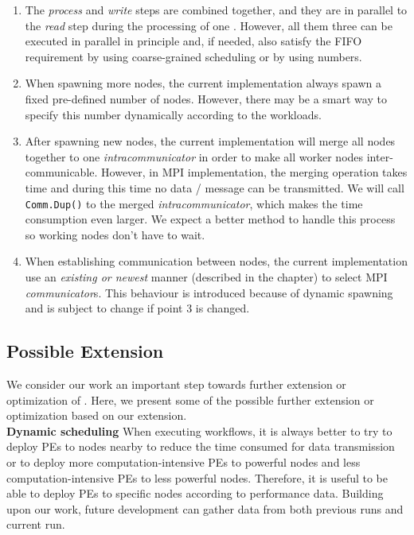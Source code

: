 \begin{enumerate}
	\item The \emph{process} and \emph{write} steps are combined together, and they are in parallel to the \emph{read} step during the processing of one \tPEInst. However, all them three can be executed in parallel in principle and, if needed, also satisfy the FIFO requirement by using coarse-grained scheduling or by using numbers.
	\item When spawning more nodes, the current implementation always spawn a fixed pre-defined number of nodes. However, there may be a smart way to specify this number dynamically according to the workloads.
	\item After spawning new nodes, the current implementation will merge all nodes together to one \emph{intracommunicator} in order to make all worker nodes inter-communicable. However, in MPI implementation, the merging operation takes time and during this time no data / message can be transmitted. We will call \lstinline|Comm.Dup()| to the merged \emph{intracommunicator}, which makes the time consumption even larger. We expect a better method to handle this process so working nodes don't have to wait.
	\item When establishing communication between nodes, the current implementation use an \emph{existing or newest} manner (described in the \tIncDep chapter) to select MPI \emph{communicator}s. This behaviour is introduced because of dynamic spawning and is subject to change if point 3 is changed.
\end{enumerate}

\subsection{Possible Extension}
We consider our work an important step towards further extension or optimization of \dpy. Here, we present some of the possible further extension or optimization based on our extension. \\

\textbf{Dynamic scheduling}\quad
When executing workflows, it is always better to try to deploy PEs to nodes nearby to reduce the time consumed for data transmission or to deploy more computation-intensive PEs to powerful nodes and less computation-intensive PEs to less powerful nodes. Therefore, it is useful to be able to deploy PEs to specific nodes according to performance data. Building upon our work, future development can gather data from both previous runs and current run. \\

